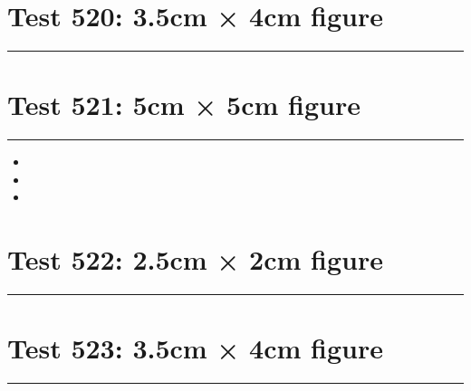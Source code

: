 \documentclass[a4paper,11pt]{article}
\begin{document}
\section*{Test 520: 3.5cm × 4cm figure}
\begin{swarmwrap}%
  \begin{minipage}[t]{3cm}
    \centering
    \rule{\linewidth}{4cm}
  \end{minipage}%
\end{swarmwrap}%
\swarmwrapnext
\lipsum[39]
\lipsum[40]
\lipsum[41]
\lipsum[42]
\lipsum[43]
\lipsum[44]
\section*{Test 521: 5cm × 5cm figure}
\begin{swarmwrap}%
  \begin{minipage}[t]{5cm}
    \centering
    \rule{\linewidth}{5cm}
  \end{minipage}%
\end{swarmwrap}%
\swarmwrapnext
\lipsum[147]
\begin{itemize}
  \item \lipsum[148][1-3]
  \item \lipsum[149][1-3]
  \item \lipsum[150][1-3]
\end{itemize}
\section*{Test 522: 2.5cm × 2cm figure}
\begin{swarmwrap}%
  \begin{minipage}[t]{2cm}
    \centering
    \rule{\linewidth}{2cm}
  \end{minipage}%
\end{swarmwrap}%
\swarmwrapnext
\lipsum[82]
\lipsum[83]
\lipsum[84]
\lipsum[85]
\lipsum[86]
\lipsum[87]
\section*{Test 523: 3.5cm × 4cm figure}
\begin{swarmwrap}%
  \begin{minipage}[t]{3cm}
    \centering
    \rule{\linewidth}{4cm}
  \end{minipage}%
\end{swarmwrap}%
\swarmwrapnext
\lipsum[54]
\lipsum[55]
\lipsum[56]
\lipsum[57]
\lipsum[58]
\lipsum[59]
\end{document}
